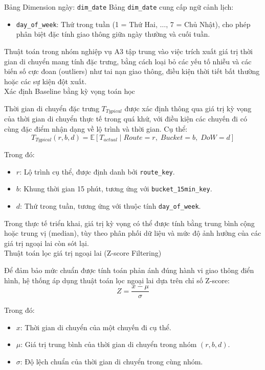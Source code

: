 Bảng Dimension ngày: \texttt{dim\_date}
Bảng \texttt{dim\_date} cung cấp ngữ cảnh lịch:
\begin{itemize}
    \item \texttt{day\_of\_week}: Thứ trong tuần (1 = Thứ Hai, $\ldots$, 7 = Chủ Nhật), cho phép phân biệt đặc tính giao thông giữa ngày thường và cuối tuần.
\end{itemize}


Thuật toán trong nhóm nghiệp vụ A3 tập trung vào việc trích xuất giá trị thời gian di chuyển mang tính đặc trưng, bằng cách loại bỏ các yếu tố nhiễu và các biến số cực đoan (outliers) như tai nạn giao thông, điều kiện thời tiết bất thường hoặc các sự kiện đột xuất.\\

Xác định Baseline bằng kỳ vọng toán học

Thời gian di chuyển đặc trưng $T_{Typical}$ được xác định thông qua giá trị kỳ vọng của thời gian di chuyển thực tế trong quá khứ, với điều kiện các chuyến đi có cùng đặc điểm nhận dạng về lộ trình và thời gian. Cụ thể:
\[
T_{Typical}(r, b, d) = \mathbb{E}\left[T_{actual} \mid Route = r,\; Bucket = b,\; DoW = d\right]
\]

Trong đó:
\begin{itemize}
    \item $r$: Lộ trình cụ thể, được định danh bởi \texttt{route\_key}.
    \item $b$: Khung thời gian 15 phút, tương ứng với \texttt{bucket\_15min\_key}.
    \item $d$: Thứ trong tuần, tương ứng với thuộc tính \texttt{day\_of\_week}.
\end{itemize}

Trong thực tế triển khai, giá trị kỳ vọng có thể được tính bằng trung bình cộng hoặc trung vị (median), tùy theo phân phối dữ liệu và mức độ ảnh hưởng của các giá trị ngoại lai còn sót lại.\\

Thuật toán lọc giá trị ngoại lai (Z-score Filtering)

Để đảm bảo mức chuẩn được tính toán phản ánh đúng hành vi giao thông điển hình, hệ thống áp dụng thuật toán lọc ngoại lai dựa trên chỉ số Z-score:
\[
Z = \frac{x - \mu}{\sigma}
\]

Trong đó:
\begin{itemize}
    \item $x$: Thời gian di chuyển của một chuyến đi cụ thể.
    \item $\mu$: Giá trị trung bình của thời gian di chuyển trong nhóm $(r, b, d)$.
    \item $\sigma$: Độ lệch chuẩn của thời gian di chuyển trong cùng nhóm.
\end{itemize}

